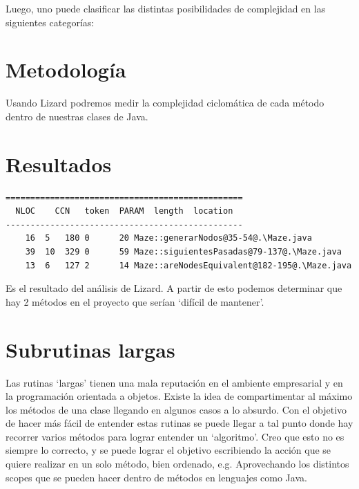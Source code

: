 \documentclass[conference]{IEEEtran}
\begin{document}
Luego, uno puede clasificar las distintas posibilidades de complejidad en las siguientes categorías:

\begin{table}[h!]
\centering
{}
\end{table}

\section{Metodología}

Usando Lizard\cite{1} podremos medir la complejidad ciclomática de cada método dentro de nuestras clases de Java.

\section{Resultados}
\begin{verbatim}
================================================
  NLOC    CCN   token  PARAM  length  location
------------------------------------------------
	16	5	180	0      20 Maze::generarNodos@35-54@.\Maze.java
	39	10	329	0      59 Maze::siguientesPasadas@79-137@.\Maze.java
	13	6	127	2      14 Maze::areNodesEquivalent@182-195@.\Maze.java
\end{verbatim}

Es el resultado del análisis de Lizard. A partir de esto podemos determinar que hay 2 métodos en el proyecto que serían `difícil de mantener'.

\section{Subrutinas largas}

Las rutinas `largas' tienen una mala reputación en el ambiente empresarial y en la programación orientada a objetos. Existe la idea de compartimentar al máximo los métodos de una clase llegando en algunos casos a lo absurdo. Con el objetivo de hacer más fácil de entender estas rutinas se puede llegar a tal punto donde hay recorrer varios métodos para lograr entender un `algoritmo'. Creo que esto no es siempre lo correcto, y se puede lograr el objetivo escribiendo la acción que se quiere realizar en un solo método, bien ordenado, e.g. Aprovechando los distintos scopes que se pueden hacer dentro de métodos en lenguajes como Java.
\end{document}
